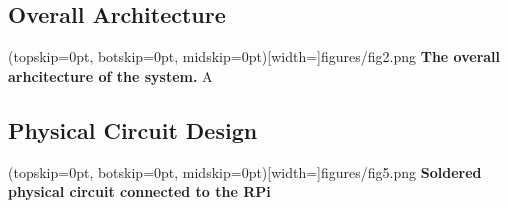 \documentclass{ieeeaccess}
\begin{document}
\subsection{Overall Architecture}
\Figure[t!](topskip=0pt, botskip=0pt,
midskip=0pt)[width=\textwidth]{{figures/fig2.png}}
{ \textbf{The overall arhcitecture of the system.}\label{fig1}}
A


\subsection{Physical Circuit Design}

\Figure[t!](topskip=0pt, botskip=0pt,
midskip=0pt)[width=\textwidth]{{figures/fig5.png}}
{ \textbf{Soldered physical circuit connected to the RPi}\label{fig1}}
\end{document}
